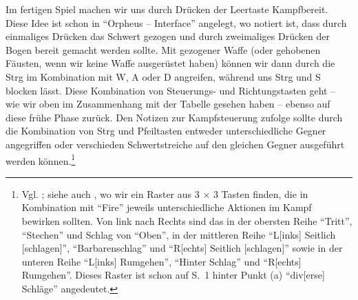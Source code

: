 \documentclass[a5paper,pagesize]{scrbook}
\begin{document}
Im fertigen Spiel machen wir uns durch Drücken der Leertaste Kampfbereit.
Diese Idee ist schon in \enquote{Orpheus -- Interface} angelegt, wo notiert ist, dass durch einmaliges Drücken das Schwert gezogen und durch zweimaliges Drücken der Bogen bereit gemacht werden sollte.\autocite[S.~2]{orpheus_interface}
Mit gezogener Waffe (oder gehobenen Fäusten, wenn wir keine Waffe ausgerüstet haben) können wir dann durch die Strg im Kombination mit W, A oder D angreifen, während uns Strg und S blocken lässt.
Diese Kombination von Steuerungs- und Richtungstasten geht -- wie wir oben im Zusammenhang mit der Tabelle gesehen haben -- ebenso auf diese frühe Phase zurück.
Den Notizen zur Kampfsteuerung zufolge sollte durch die Kombination von Strg und Pfeiltasten entweder unterschiedliche Gegner angegriffen oder verschieden Schwertstreiche auf den gleichen Gegner ausgeführt werden können.\footnote{Vgl. \autocite[S.~1--3]{orpheus_kampfsteuerung}; siehe auch \autocite[S.~4]{orpheus_interface}, wo wir ein Raster aus 3 × 3 Tasten finden, die in Kombination mit \enquote{Fire} jeweils unterschiedliche Aktionen im Kampf bewirken sollten. Von link nach Rechts sind das in der obersten Reihe \enquote{Tritt}, \enquote{Stechen} und Schlag von \enquote{Oben}, in der mittleren Reihe \enquote{L[inks] Seitlich [schlagen]}, \enquote{Barbarenschlag} und \enquote{R[echts] Seitlich [schlagen]} sowie in der unteren Reihe \enquote{L[inks] Rumgehen}, \enquote{Hinter Schlag} und \enquote{R[echts] Rumgehen}. Dieses Raster ist schon auf S.~1 hinter Punkt (a) \enquote{div[erse] Schläge} angedeutet.}
\end{document}
